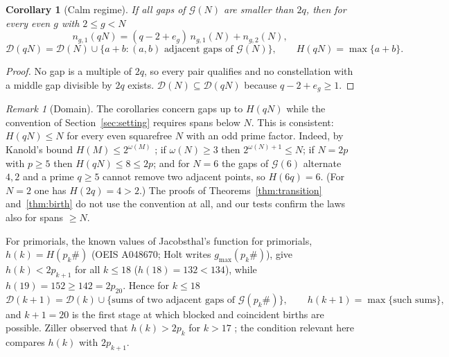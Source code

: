 \documentclass[11pt]{article}
\newtheorem{corollary}[theorem]{Corollary}
\theoremstyle{definition}
\theoremstyle{remark}
\newtheorem{remark}[theorem]{Remark}
\newcommand{\G}{\mathcal{G}}
\newcommand{\D}{\mathcal{D}}
\begin{document}
\begin{corollary}[Calm regime]\label{cor:calm}
If all gaps of $\G(N)$ are smaller than $2q$, then for every even $g$ with $2 \le g < N$
\[
  n_{g,1}(qN) = (q - 2 + e_g)\, n_{g,1}(N) + n_{g,2}(N),
\]
\[
  \D(qN) = \D(N) \cup \{ a + b : (a, b) \text{ adjacent gaps of } \G(N) \},
  \qquad H(qN) = \max\{ a + b \}.
\]
\end{corollary}

\begin{proof}
No gap is a multiple of $2q$, so every pair qualifies and no constellation with a middle gap divisible by $2q$ exists. $\D(N) \subseteq \D(qN)$ because $q - 2 + e_g \ge 1$.
\end{proof}

\begin{remark}[Domain]\label{rem:domain}
The corollaries concern gaps up to $H(qN)$ while the convention of Section~\ref{sec:setting} requires spans below $N$. This is consistent: $H(qN) \le N$ for every even squarefree $N$ with an odd prime factor. Indeed, by Kanold's bound $H(M) \le 2^{\omega(M)}$ \cite{Ka67}; if $\omega(N) \ge 3$ then $2^{\omega(N)+1} \le N$; if $N = 2p$ with $p \ge 5$ then $H(qN) \le 8 \le 2p$; and for $N = 6$ the gaps of $\G(6)$ alternate $4, 2$ and a prime $q \ge 5$ cannot remove two adjacent points, so $H(6q) = 6$. (For $N = 2$ one has $H(2q) = 4 > 2$.) The proofs of Theorems~\ref{thm:transition} and~\ref{thm:birth} do not use the convention at all, and our tests confirm the laws also for spans $\ge N$.
\end{remark}

For primorials, the known values of Jacobsthal's function for primorials, $h(k) = H(p_k\#)$ (OEIS A048670; Holt writes $g_{\max}(p_k\#)$), give $h(k) < 2p_{k+1}$ for all $k \le 18$ ($h(18) = 132 < 134$), while $h(19) = 152 \ge 142 = 2p_{20}$. Hence for $k \le 18$
\[
  \D(k+1) = \D(k) \cup \{\text{sums of two adjacent gaps of } \G(p_k\#)\}, \qquad h(k+1) = \max\{\text{such sums}\},
\]
and $k + 1 = 20$ is the first stage at which blocked and coincident births are possible. Ziller observed that $h(k) > 2p_k$ for $k > 17$ \cite[\S4]{Zi20}; the condition relevant here compares $h(k)$ with $2p_{k+1}$.
\end{document}
